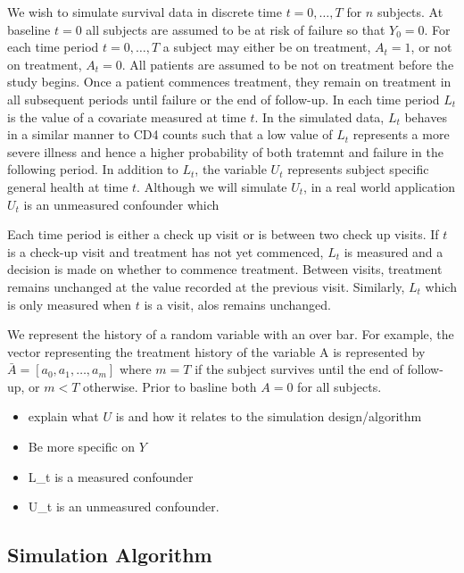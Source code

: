 \documentclass[11pt]{article}
\providecommand{\tightlist}{%
      \setlength{\itemsep}{0pt}\setlength{\parskip}{0pt}}
\begin{document}
We wish to simulate survival data in discrete time \(t = 0, \dots, T\)
for \(n\) subjects. At baseline \(t=0\) all subjects are assumed to be
at risk of failure so that \(Y_0 = 0\). For each time period
\(t = 0, \dots, T\) a subject may either be on treatment, \(A_t = 1\),
or not on treatment, \(A_t = 0\). All patients are assumed to be not on
treatment before the study begins. Once a patient commences treatment,
they remain on treatment in all subsequent periods until failure or the
end of follow-up. In each time period \(L_t\) is the value of a
covariate measured at time \(t\). In the simulated data, \(L_t\) behaves
in a similar manner to CD4 counts such that a low value of \(L_t\)
represents a more severe illness and hence a higher probability of both
tratemnt and failure in the following period. In addition to \(L_t\),
the variable \(U_t\) represents subject specific general health at time
\(t\). Although we will simulate \(U_t\), in a real world application
\(U_t\) is an unmeasured confounder which

Each time period is either a check up visit or is between two check up
visits. If \(t\) is a check-up visit and treatment has not yet
commenced, \(L_t\) is measured and a decision is made on whether to
commence treatment. Between visits, treatment remains unchanged at the
value recorded at the previous visit. Similarly, \(L_t\) which is only
measured when \(t\) is a visit, alos remains unchanged.

We represent the history of a random variable with an over bar. For
example, the vector representing the treatment history of the variable A
is represented by \(\bar A = [a_0, a_1, \dots, a_m]\) where \(m=T\) if
the subject survives until the end of follow-up, or \(m < T\) otherwise.
Prior to basline both \(A = 0\) for all subjects.

\begin{itemize}
\tightlist
\item
  explain what \(U\) is and how it relates to the simulation
  design/algorithm
\item
  Be more specific on \(Y\)
\item
  L\_t is a measured confounder
\item
  U\_t is an unmeasured confounder.
\end{itemize}

\subsection{Simulation Algorithm}\label{simulation-algorithm}
\end{document}
